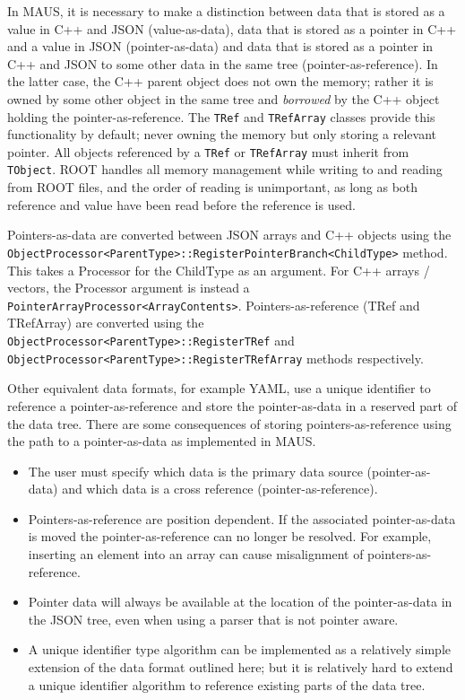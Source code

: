 In MAUS, it is necessary to make a distinction between data that is stored as a value in C++ and JSON (value-as-data), 
data that is stored as a pointer in C++ and a value in JSON (pointer-as-data) 
and data that is stored as a pointer in C++ and JSON to some other data in the same tree (pointer-as-reference). 
In the latter case, the C++ parent object does not own the memory; 
rather it is owned by some other object in the same tree and 
\emph{borrowed} by the C++ object holding the pointer-as-reference.
The \verb|TRef| and \verb|TRefArray| classes provide this functionality by default;
never owning the memory but only storing a relevant pointer.
All objects referenced by a \verb|TRef| or \verb|TRefArray|
must inherit from \verb|TObject|.
ROOT handles all memory management while writing to and reading from ROOT files,
and the order of reading is unimportant,
as long as both reference and value have been read before the reference is used.

Pointers-as-data are converted between JSON arrays and C++ objects
using the \verb|ObjectProcessor<ParentType>::RegisterPointerBranch<ChildType>| method.
This takes a Processor for the ChildType as an argument.
For C++ arrays / vectors, the Processor argument is instead a 
\verb|PointerArrayProcessor<ArrayContents>|.
Pointers-as-reference (TRef and TRefArray) are converted using the
\verb|ObjectProcessor<ParentType>::RegisterTRef| and 
\verb|ObjectProcessor<ParentType>::RegisterTRefArray| methods respectively.

Other equivalent data formats, for example YAML, use a unique identifier to reference a pointer-as-reference and store the pointer-as-data in a reserved part of the data tree. There are some consequences of storing pointers-as-reference using the path to a pointer-as-data as implemented in MAUS.
\begin{itemize}
\item The user must specify which data is the primary data source (pointer-as-data) and which data is a cross reference (pointer-as-reference).
\item Pointers-as-reference are position dependent. If the associated pointer-as-data is moved the pointer-as-reference can no longer be resolved. For example, inserting an element into an array can cause misalignment of pointers-as-reference.
\item Pointer data will always be available at the location of the pointer-as-data in the JSON tree, even when using a parser that is not pointer aware.
\item A unique identifier type algorithm can be implemented as a relatively simple extension of the data format outlined here; but it is relatively hard to extend a unique identifier algorithm to reference existing parts of the data tree.
\end{itemize}

